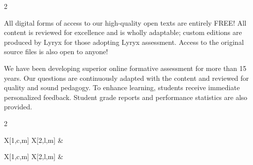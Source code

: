 \begin{center}
\begin{multicols}{2}
\parbox{0.9\linewidth}{
All digital forms of access to our high-quality open texts are entirely FREE! All content is reviewed for excellence and is wholly adaptable; custom editions are produced by Lyryx for those adopting Lyryx assessment. Access to the original source files is also open to anyone! 
}

\columnbreak

\parbox{0.9\linewidth}{
We have been developing superior online formative assessment for more than 15 years. Our questions are continuously adapted with the content and reviewed for quality and sound pedagogy. To enhance learning, students receive immediate personalized feedback. Student grade reports and performance statistics are also provided.
	}
\end{multicols}
\end{center}

\vspace{2em}

\begin{multicols}{2}
\begin{center}
\begin{lscshdrbox}
\begin{tabu}{X[1,c,m] X[2,l,m]}
\vspace{0pt}
&
\vspace{0pt}
\textcolor{white}{\textbf{\fontsize{14}{20}\selectfont {SUPPORT}}}
\end{tabu}
\end{lscshdrbox}
\end{center}

\columnbreak

\begin{center}
\begin{lscshdrbox}
\begin{tabu}{X[1,c,m] X[2,l,m]}
\vspace{0pt}
&
\vspace{0pt}
\textcolor{white}{\textbf{\fontsize{14}{20}\selectfont {INSTRUCTOR SUPPLEMENTS}}}
\end{tabu}
\end{lscshdrbox}
\end{center}
\end{multicols}

